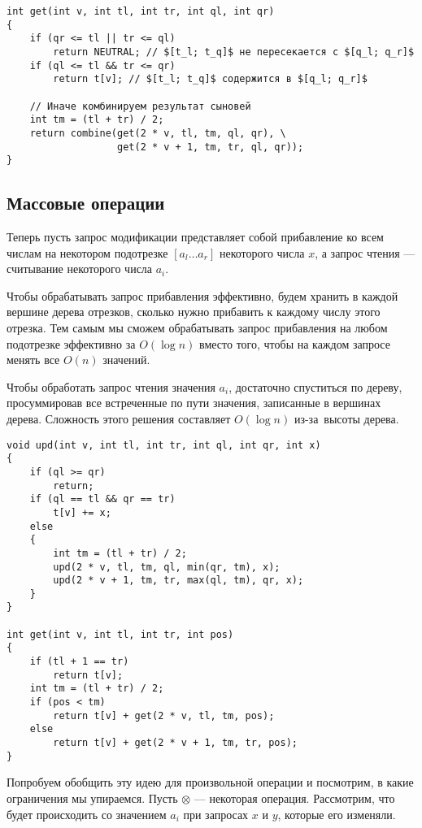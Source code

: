 \begin{verbatim}
int get(int v, int tl, int tr, int ql, int qr)
{
    if (qr <= tl || tr <= ql)
        return NEUTRAL; // $[t_l; t_q]$ не пересекается с $[q_l; q_r]$
    if (ql <= tl && tr <= qr)
        return t[v]; // $[t_l; t_q]$ содержится в $[q_l; q_r]$

    // Иначе комбинируем результат сыновей
    int tm = (tl + tr) / 2;
    return combine(get(2 * v, tl, tm, ql, qr), \
                   get(2 * v + 1, tm, tr, ql, qr));
}
\end{verbatim}

\subsection{Массовые операции}

Теперь пусть запрос модификации представляет собой прибавление ко всем числам на некотором подотрезке $[a_l\ldots a_r]$ некоторого числа $x$, а запрос чтения --- считывание некоторого числа $a_i$.

Чтобы обрабатывать запрос прибавления эффективно, будем хранить в каждой вершине дерева отрезков, сколько нужно прибавить к каждому числу этого отрезка. Тем самым мы сможем обрабатывать запрос прибавления на любом подотрезке эффективно за $O(\log n)$ вместо того, чтобы на каждом запросе менять все $O(n)$ значений.

Чтобы обработать запрос чтения значения $a_i$, достаточно спуститься по дереву, просуммировав все встреченные по пути значения, записанные в вершинах дерева. Сложность этого решения составляет $O(\log n)$ из-за~высоты дерева.

\begin{verbatim}
void upd(int v, int tl, int tr, int ql, int qr, int x)
{
    if (ql >= qr)
        return;
    if (ql == tl && qr == tr)
        t[v] += x;
    else
    {
        int tm = (tl + tr) / 2;
        upd(2 * v, tl, tm, ql, min(qr, tm), x);
        upd(2 * v + 1, tm, tr, max(ql, tm), qr, x);
    }
}

int get(int v, int tl, int tr, int pos)
{
    if (tl + 1 == tr)
        return t[v];
    int tm = (tl + tr) / 2;
    if (pos < tm)
        return t[v] + get(2 * v, tl, tm, pos);
    else
        return t[v] + get(2 * v + 1, tm, tr, pos);
}
\end{verbatim}

Попробуем обобщить эту идею для произвольной операции и посмотрим, в какие ограничения мы упираемся. Пусть $\otimes$ --- некоторая операция. Рассмотрим, что будет происходить со значением $a_i$ при запросах $x$ и $y$, которые его изменяли.

